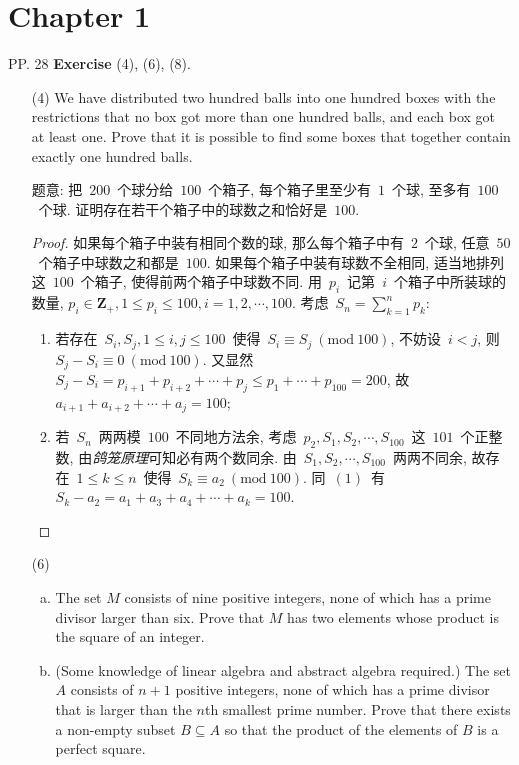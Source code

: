 \documentclass[UTF8,a4paper,10pt]{article}
\newcommand{\Mod}[1]{\ (\mathrm{mod}\ #1)}
\begin{document}
\section*{Chapter 1}
PP. 28 {\bf Exercise} (4), (6), (8).
\begin{enumerate}
	\kaishu
	\item[(4)] We have distributed two hundred balls into one hundred boxes with
	      the restrictions that no box got more than one hundred balls, and each
	      box got at least one. Prove that it is possible to find some boxes that
	      together contain exactly one hundred balls.

	      题意: 把~$200$~个球分给~$100$~个箱子, 每个箱子里至少有~$1$~个球, 至多有~$100$
	      ~个球. 证明存在若干个箱子中的球数之和恰好是~$100$.
	      \begin{proof}
		      如果每个箱子中装有相同个数的球, 那么每个箱子中有~$2$~个球, 任意~$50$~个箱子中球数之和都是~$100$.
		      如果每个箱子中装有球数不全相同, 适当地排列这~$100$~个箱子, 使得前两个箱子中球数不同. 用~$p_i$~记第~$i$~个箱子中所装球的数量, $p_i\in\mathbf{Z}_{+}, 1\leqslant p_i\leqslant 100, i=1,2,\cdots,100$. 考虑~$S_n=\sum_{k=1}^{n} p_k$:
		      \begin{enumerate}[(1)]
			      \item 若存在~$S_i, S_j, 1\leqslant i,j\leqslant 100$~使得~$S_i\equiv S_j\Mod{100}$, 不妨设~$i<j$, 则~$S_j-S_i\equiv 0\Mod{100}$. 又显然~$S_j-S_i=p_{i+1}+p_{i+2}+\cdots+p_{j}\leqslant p_1+\cdots+p_{100}=200$, 故~$a_{i+1}+a_{i+2}+\cdots+a_{j}=100$;
			      \item 若~$S_n$~两两模~$100$~不同地方法余, 考虑~$p_2, S_1, S_2, \cdots, S_{100}$~这~$101$~个正整数, 由\emph{鸽笼原理}可知必有两个数同余. 由~$S_1, S_2,\cdots, S_{100}$~两两不同余, 故存在~$1\leqslant k\leqslant n$~使得~$S_k\equiv a_2\Mod{100}$. 同~$(1)$~有~$S_k-a_2=a_1+a_3+a_4+\cdots+a_k=100$.
		      \end{enumerate}
	      \end{proof}
	\item[(6)]
	      \begin{enumerate}[(a)]
		      \item The set $M$ consists of nine positive integers, none of which has a prime divisor larger than six. Prove that $M$ has two elements whose product is the square of an integer.
		      \item (Some knowledge of linear algebra and abstract algebra required.) The set $A$ consists of $n+1$ positive integers, none of which has a prime divisor that is larger than the $n$th smallest prime number. Prove that there exists a non-empty subset $B\subseteq A$ so that the product of the elements of $B$ is a perfect square.
	      \end{enumerate}


\end{enumerate}
\end{document}
